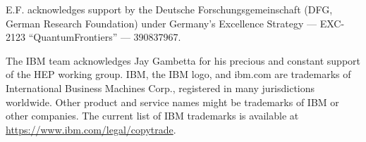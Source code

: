 \begin{acknowledgments}
E.F. acknowledges support by the Deutsche Forschungsgemeinschaft (DFG, German Research Foundation) under Germany’s Excellence Strategy –– EXC-2123 “QuantumFrontiers” — 390837967.

The IBM team acknowledges Jay Gambetta for his precious and constant support of the HEP working group. 
IBM, the IBM logo, and ibm.com are trademarks of International Business Machines Corp., registered in many jurisdictions worldwide. Other product and service names might be trademarks of IBM or other companies. The current list of IBM trademarks is available at \url{https://www.ibm.com/legal/copytrade}.

\end{acknowledgments}